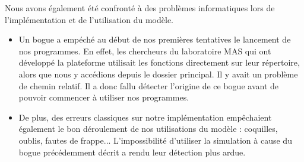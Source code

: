Nous avons également été confronté à des problèmes informatiques lors de l'implémentation et de l'utilisation du modèle.
\begin{itemize}
	\item Un bogue a empéché au début de nos premières tentatives le lancement de nos programmes. En effet, les chercheurs
du laboratoire MAS qui ont développé la plateforme utilisait les fonctions directement sur leur répertoire, alors que nous y accédions depuis le dossier principal. Il y avait un problème de chemin relatif. Il a donc fallu détecter l'origine de ce bogue avant de pouvoir commencer à utiliser nos programmes. 
	
	\item De plus, des erreurs classiques sur notre implémentation empêchaient également le bon déroulement de nos utilisations du modèle : coquilles, oublis, fautes de frappe... L'impossibilité d'utiliser la simulation à cause du bogue précédemment décrit a rendu leur détection plus ardue.

\end{itemize}
